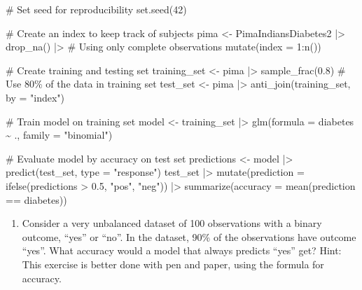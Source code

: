 \documentclass[
  letterpaper,
  DIV=11,
  numbers=noendperiod]{scrreprt}
\newenvironment{Shaded}{\begin{snugshade}}{\end{snugshade}}
\newcommand{\AttributeTok}[1]{\textcolor[rgb]{0.40,0.45,0.13}{#1}}
\newcommand{\CommentTok}[1]{\textcolor[rgb]{0.37,0.37,0.37}{#1}}
\newcommand{\DecValTok}[1]{\textcolor[rgb]{0.68,0.00,0.00}{#1}}
\newcommand{\FloatTok}[1]{\textcolor[rgb]{0.68,0.00,0.00}{#1}}
\newcommand{\FunctionTok}[1]{\textcolor[rgb]{0.28,0.35,0.67}{#1}}
\newcommand{\NormalTok}[1]{\textcolor[rgb]{0.00,0.23,0.31}{#1}}
\newcommand{\OtherTok}[1]{\textcolor[rgb]{0.00,0.23,0.31}{#1}}
\newcommand{\SpecialCharTok}[1]{\textcolor[rgb]{0.37,0.37,0.37}{#1}}
\newcommand{\StringTok}[1]{\textcolor[rgb]{0.13,0.47,0.30}{#1}}
\providecommand{\tightlist}{%
  \setlength{\itemsep}{0pt}\setlength{\parskip}{0pt}}\usepackage{longtable,booktabs,array}
\begin{document}
\begin{Shaded}
\begin{Highlighting}[]
\CommentTok{\# Set seed for reproducibility}
\FunctionTok{set.seed}\NormalTok{(}\DecValTok{42}\NormalTok{) }

\CommentTok{\# Create an index to keep track of subjects}
\NormalTok{pima }\OtherTok{\textless{}{-}}\NormalTok{ PimaIndiansDiabetes2 }\SpecialCharTok{|\textgreater{}} 
  \FunctionTok{drop\_na}\NormalTok{() }\SpecialCharTok{|\textgreater{}} \CommentTok{\# Using only complete observations}
  \FunctionTok{mutate}\NormalTok{(}\AttributeTok{index =} \DecValTok{1}\SpecialCharTok{:}\FunctionTok{n}\NormalTok{())}

\CommentTok{\# Create training and testing set}
\NormalTok{training\_set }\OtherTok{\textless{}{-}}\NormalTok{ pima }\SpecialCharTok{|\textgreater{}} 
  \FunctionTok{sample\_frac}\NormalTok{(}\FloatTok{0.8}\NormalTok{) }\CommentTok{\# Use 80\% of the data in training set}
\NormalTok{test\_set }\OtherTok{\textless{}{-}}\NormalTok{ pima }\SpecialCharTok{|\textgreater{}} 
  \FunctionTok{anti\_join}\NormalTok{(training\_set, }\AttributeTok{by =} \StringTok{"index"}\NormalTok{)}

\CommentTok{\# Train model on training set}
\NormalTok{model }\OtherTok{\textless{}{-}}\NormalTok{ training\_set }\SpecialCharTok{|\textgreater{}} 
  \FunctionTok{glm}\NormalTok{(}\AttributeTok{formula =}\NormalTok{ diabetes }\SpecialCharTok{\textasciitilde{}}\NormalTok{ ., }\AttributeTok{family =} \StringTok{"binomial"}\NormalTok{)}

\CommentTok{\# Evaluate model by accuracy on test set}
\NormalTok{predictions }\OtherTok{\textless{}{-}}\NormalTok{ model }\SpecialCharTok{|\textgreater{}} 
  \FunctionTok{predict}\NormalTok{(test\_set, }\AttributeTok{type =} \StringTok{"response"}\NormalTok{)}
\NormalTok{test\_set }\SpecialCharTok{|\textgreater{}} 
  \FunctionTok{mutate}\NormalTok{(}\AttributeTok{prediction =} \FunctionTok{ifelse}\NormalTok{(predictions }\SpecialCharTok{\textgreater{}} \FloatTok{0.5}\NormalTok{, }\StringTok{"pos"}\NormalTok{, }\StringTok{"neg"}\NormalTok{)) }\SpecialCharTok{|\textgreater{}} 
  \FunctionTok{summarize}\NormalTok{(}\AttributeTok{accuracy =} \FunctionTok{mean}\NormalTok{(prediction }\SpecialCharTok{==}\NormalTok{ diabetes))}
\end{Highlighting}
\end{Shaded}

\begin{enumerate}
\def\labelenumi{\arabic{enumi}.}
\setcounter{enumi}{3}
\tightlist
\item
  Consider a very unbalanced dataset of 100 observations with a binary
  outcome, ``yes'' or ``no''. In the dataset, 90\% of the observations
  have outcome ``yes''. What accuracy would a model that always predicts
  ``yes'' get? Hint: This exercise is better done with pen and paper,
  using the formula for accuracy.
\end{enumerate}
\end{document}
